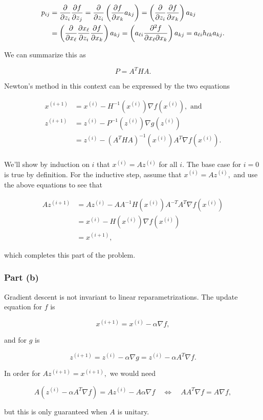 \documentclass[]{article}
\begin{document}
\[
\begin{aligned}
p_{ij} & = \frac{\partial}{\partial z_i}\frac{\partial f}{\partial z_j} = \frac{\partial}{\partial z_i}\left(\frac{\partial f}{\partial x_k}a_{kj}\right)
= \left(\frac{\partial}{\partial z_i}\frac{\partial f}{\partial x_k}\right)a_{kj} \\
& = \left(\frac{\partial}{\partial x_\ell}\frac{\partial x_\ell}{\partial z_i}\frac{\partial f}{\partial x_k}\right)a_{kj}
= \left(a_{\ell i}\frac{\partial^2f}{\partial x_\ell\partial x_k}\right)a_{kj}
= a_{\ell i}h_{\ell k}a_{kj}.
\end{aligned}
\]

We can summarize this as

\[P = A^T H A.\]

Newton's method in this context can be expressed by the two equations

\[\begin{aligned}
x^{(i+1)} & = x^{(i)} - H^{-1}(x^{(i)}) \nabla f(x^{(i)}), \text{ and} \\
z^{(i+1)} & = z^{(i)} - P^{-1}(z^{(i)}) \nabla g(z^{(i)}) \\
          & = z^{(i)} - (A^THA)^{-1}(x^{(i)}) A^T\nabla f(x^{(i)}). \\
\end{aligned}\]

We'll show by induction on \(i\) that \(x^{(i)} = Az^{(i)}\) for all
\(i.\) The base case for \(i=0\) is true by definition. For the
inductive step, assume that \(x^{(i)} = Az^{(i)},\) and use the above
equations to see that

\[\begin{aligned}
Az^{(i+1)} & = Az^{(i)} - AA^{-1}H(x^{(i)})A^{-T}A^T\nabla f(x^{(i)}) \\
           & = x^{(i)} - H(x^{(i)}) \nabla f(x^{(i)}) \\
           & = x^{(i+1)},
\end{aligned}\]

which completes this part of the problem.

\subsubsection{Part (b)}\label{part-b-2}

Gradient descent is not invariant to linear reparametrizations. The
update equation for \(f\) is

\[x^{(i+1)} = x^{(i)} - \alpha\nabla f,\]

and for \(g\) is

\[z^{(i+1)} = z^{(i)} - \alpha\nabla g = z^{(i)} - \alpha A^T\nabla f.\]

In order for \(Az^{(i+1)} = x^{(i+1)},\) we would need

\[A(z^{(i)} - \alpha A^T\nabla f) = Az^{(i)} - A\alpha\nabla f
\quad\Leftrightarrow\quad
AA^T\nabla f = A\nabla f,\]

but this is only guaranteed when \(A\) is unitary.
\end{document}
